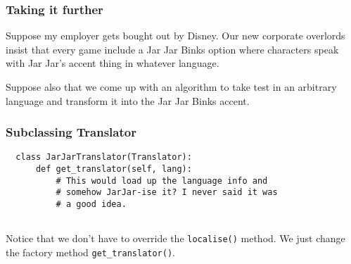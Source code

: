 \documentclass[10pt]{beamer}
\begin{document}
\begin{frame}
  \frametitle{Taking it further}
  
  Suppose my employer gets bought out by Disney. Our new corporate overlords
  insist that every game include a Jar Jar Binks option where characters speak
  with Jar Jar's accent thing in whatever language.
  
  \vspace{5mm}
  Suppose also that we come up with an algorithm to take test in an arbitrary
  language and transform it into the Jar Jar Binks accent.    
\end{frame}

\begin{frame}[fragile]
  \frametitle{Subclassing Translator}

  
  \begin{verbatim}
  class JarJarTranslator(Translator):
      def get_translator(self, lang):
          # This would load up the language info and
          # somehow JarJar-ise it? I never said it was
          # a good idea.
          
  \end{verbatim}
  Notice that we don't have to override the \texttt{localise()} method. We
  just change the factory method \texttt{get\_translator()}.
 \end{frame}  
 
\end{document}
